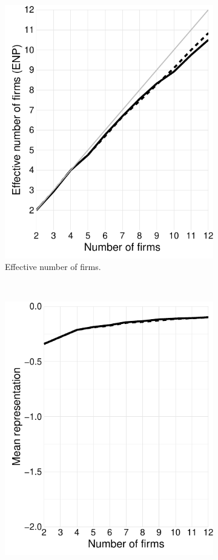 \documentclass[preprint, 12pt]{elsarticle}
\begin{document}
\begin{figure}[ht!]
\begin{subfigure}[t]{0.315\textwidth}
		\includegraphics[width=\textwidth, trim={4mm 0 0 0}]{Graphics/figA12.pdf}
		\caption{Effective number of firms.}
		\label{fig:enp_maxcovrnd}
	\end{subfigure}
	~
	\begin{subfigure}[t]{0.315\textwidth}
		\centering
		\includegraphics[width=\textwidth, trim={4mm 0 0 0}]{Graphics/figA13.pdf}

\end{subfigure}
\end{figure}
\end{document}
